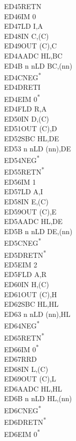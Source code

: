 \documentclass[twoside,openright,a4paper]{book}
\begin{document}
\begin{multicols}{3}
{\begin{tabbing}
	ED45\>RETN\\
	ED46\>IM 0\\
	ED47\>LD I,A\\
	ED48\>IN C,(C)\\
	ED49\>OUT (C),C\\
	ED4A\>ADC HL,BC\\
	ED4B n n\>LD BC,(nn)\\
	ED4C\>NEG\textsuperscript{*}\\
	ED4D\>RETI\\
	ED4E\>IM 0\textsuperscript{*}\\
	ED4F\>LD R,A\\
	ED50\>IN D,(C)\\
	ED51\>OUT (C),D\\
	ED52\>SBC HL,DE\\
	ED53 n n\>LD (nn),DE\\
	ED54\>NEG\textsuperscript{*}\\
	ED55\>RETN\textsuperscript{*}\\
	ED56\>IM 1\\
	ED57\>LD A,I\\
	ED58\>IN E,(C)\\
	ED59\>OUT (C),E\\
	ED5A\>ADC HL,DE\\
	ED5B n n\>LD DE,(nn)\\
	ED5C\>NEG\textsuperscript{*}\\
	ED5D\>RETN\textsuperscript{*}\\
	ED5E\>IM 2\\
	ED5F\>LD A,R\\
	ED60\>IN H,(C)\\
	ED61\>OUT (C),H\\
	ED62\>SBC HL,HL\\
	ED63 n n\>LD (nn),HL\\
	ED64\>NEG\textsuperscript{*}\\
	ED65\>RETN\textsuperscript{*}\\
	ED66\>IM 0\textsuperscript{*}\\
	ED67\>RRD\\
	ED68\>IN L,(C)\\
	ED69\>OUT (C),L\\
	ED6A\>ADC HL,HL\\
	ED6B n n\>LD HL,(nn)\\
	ED6C\>NEG\textsuperscript{*}\\
	ED6D\>RETN\textsuperscript{*}\\
	ED6E\>IM 0\textsuperscript{*}\\

\end{tabbing}}
\end{multicols}
\end{document}
